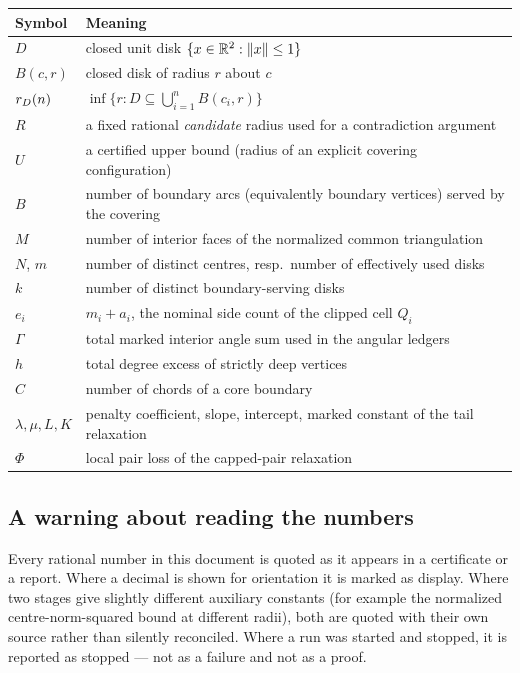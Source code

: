 \begin{center}
\footnotesize
\begin{tabular}{@{}ll@{}}
\toprule
Symbol & Meaning \\
\midrule
$D$ & closed unit disk $\{x\in\mathbb{R}^2:\|x\|\le 1\}$ \\
$B(c,r)$ & closed disk of radius $r$ about $c$ \\
$r_{D}(n)$ & $\inf\{r: D\subseteq\bigcup_{i=1}^{n}B(c_i,r)\}$ \\
$R$ & a fixed rational \emph{candidate} radius used for a contradiction argument \\
$U$ & a certified upper bound (radius of an explicit covering configuration) \\
$B$ & number of boundary arcs (equivalently boundary vertices) served by the covering \\
$M$ & number of interior faces of the normalized common triangulation \\
$N$, $m$ & number of distinct centres, resp.\ number of effectively used disks \\
$k$ & number of distinct boundary-serving disks \\
$e_i$ & $m_i+a_i$, the nominal side count of the clipped cell $Q_i$ \\
$\Gamma$ & total marked interior angle sum used in the angular ledgers \\
$h$ & total degree excess of strictly deep vertices \\
$C$ & number of chords of a core boundary \\
$\lambda,\mu,L,K$ & penalty coefficient, slope, intercept, marked constant of the tail relaxation \\
$\Phi$ & local pair loss of the capped-pair relaxation \\
\bottomrule
\end{tabular}
\end{center}

\subsection*{A warning about reading the numbers}

Every rational number in this document is quoted as it appears in a certificate or a report. Where
a decimal is shown for orientation it is marked as display. Where two stages give slightly
different auxiliary constants (for example the normalized centre-norm-squared bound at different
radii), both are quoted with their own source rather than silently reconciled. Where a run was
started and stopped, it is reported as stopped --- not as a failure and not as a proof.
